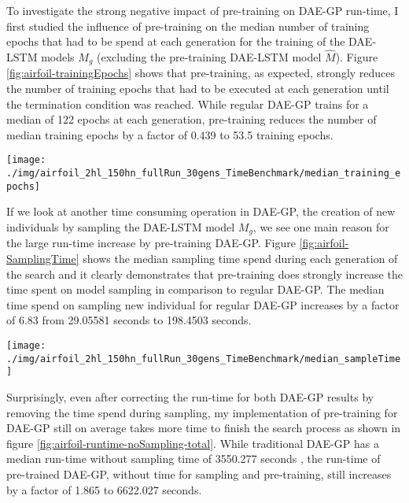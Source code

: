 \documentclass[
  11pt,
]{article}
\let\origfigure\figure
\let\endorigfigure\endfigure
\renewenvironment{figure}[1][2] {
    \expandafter\origfigure\expandafter[H]
} {
    \endorigfigure
}
\begin{document}
To investigate the strong negative impact of pre-training on DAE-GP run-time, I first studied the influence of pre-training on the median number of training epochs that had to be spend at each generation for the training of the DAE-LSTM models \(M_g\) (excluding the pre-training DAE-LSTM model \(\hat{M}\)).
Figure \ref{fig:airfoil-trainingEpochs} shows that pre-training, as expected, strongly reduces the number of training epochs that had to be executed at each generation until the termination condition was reached.
While regular DAE-GP trains for a median of 122 epochs at each generation, pre-training reduces the number of median training epochs by a factor of 0.439 to 53.5 training epochs.

\begin{figure}[c]

{\centering \texttt{[image: ./img/airfoil\_2hl\_150hn\_fullRun\_30gens\_TimeBenchmark/median\_training\_epochs]} 

}

\caption{Median Number of Training Epochs per Generation - Airfoil}\label{fig:airfoil-trainingEpochs}
\end{figure}

If we look at another time consuming operation in DAE-GP, the creation of new individuals by sampling the DAE-LSTM model \(M_g\), we see one main reason for the large run-time increase by pre-training DAE-GP.
Figure \ref{fig:airfoil-SamplingTime} shows the median sampling time spend during each generation of the search and it clearly demonstrates that pre-training does strongly increase the time spent on model sampling in comparison to regular DAE-GP.
The median time spend on sampling new individual for regular DAE-GP increases by a factor of 6.83 from 29.05581 seconds to 198.4503 seconds.

\begin{figure}[c]

{\centering \texttt{[image: ./img/airfoil\_2hl\_150hn\_fullRun\_30gens\_TimeBenchmark/median\_sampleTime]} 

}

\caption{Median Sampling Time per Generation - Airfoil}\label{fig:airfoil-SamplingTime}
\end{figure}

Surprisingly, even after correcting the run-time for both DAE-GP results by removing the time spend during sampling, my implementation of pre-training for DAE-GP still on average takes more time to finish the search process as shown in figure \ref{fig:airfoil-runtime-noSampling-total}.
While traditional DAE-GP has a median run-time without sampling time of 3550.277 seconds , the run-time of pre-trained DAE-GP, without time for sampling and pre-training, still increases by a factor of 1.865 to 6622.027 seconds.
\end{document}

